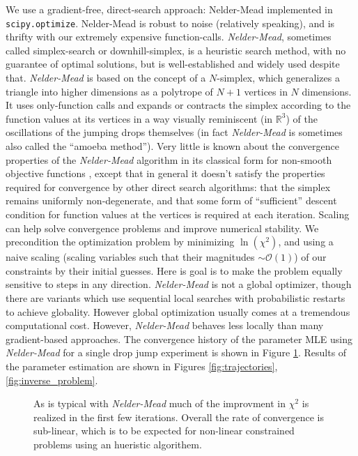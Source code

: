 \documentclass[12pt,a4paper,oneside]{book}
\begin{document}
We use a gradient-free, direct-search approach: Nelder-Mead \cite{nelder_simplex_1965} implemented in \verb|scipy.optimize|. Nelder-Mead is robust to noise (relatively speaking), and is thrifty with our extremely expensive function-calls.  \emph{Nelder-Mead}, sometimes called simplex-search or downhill-simplex, is a heuristic search method, with no guarantee of optimal solutions, but is well-established and widely used despite that. \emph{Nelder-Mead} is based on the concept of a $N$-simplex, which generalizes a triangle into higher dimensions as a polytrope of $N + 1$ vertices in $N$ dimensions. It uses only-function calls and expands or contracts the simplex according to the function values at its vertices in a way visually reminiscent (in $\mathbb{R}^3$) of the oscillations of the jumping drops themselves (in fact \emph{Nelder-Mead} is sometimes also called the ``amoeba method''). Very little is known about the convergence properties of the \emph{Nelder-Mead} algorithm in its classical form for non-smooth objective functions \cite{price_convergent_2002}, except that in general it doesn't satisfy the properties required for convergence by other direct search algorithms: that the simplex remains uniformly non-degenerate, and that some form of ``sufficient'' descent condition for function values at the vertices is required at each iteration. Scaling can help solve convergence problems and improve numerical stability. We precondition the optimization problem by minimizing $\ln(\chi^2)$, and using a naive scaling (scaling variables such that their magnitudes $\sim \mathcal{O}(1)$) of our constraints by their initial guesses. Here is goal is to make the problem equally sensitive to steps in any direction. \emph{Nelder-Mead} is not a global optimizer, though there are variants which use sequential local searches with probabilistic restarts to achieve globality. However global optimization usually comes at a tremendous computational cost. However, \emph{Nelder-Mead} behaves less locally than many gradient-based approaches. The convergence history of the parameter MLE using \emph{Nelder-Mead} for a single drop jump experiment is shown in Figure \ref{fig:convergence}. Results of the parameter estimation are shown in Figures \ref{fig:trajectories}, \ref{fig:inverse_problem}.

\begin{figure}[h]
    \centering
    
    \caption{As is typical with \emph{Nelder-Mead} much of the improvment in $\chi^2$ is realized in the first few iterations. Overall the rate of convergence is sub-linear, which is to be expected for non-linear constrained problems using an hueristic algorithem.\label{fig:convergence}}
\end{figure}
\end{document}
